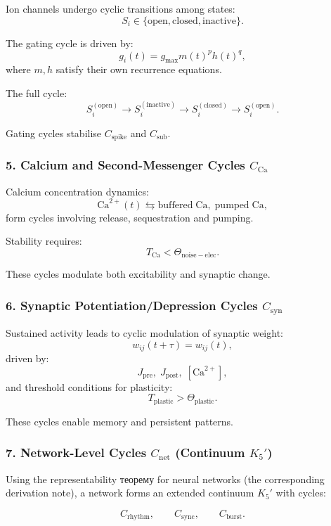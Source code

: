Ion channels undergo cyclic transitions among states:
\[
  S_i \in \{\mathrm{open}, \mathrm{closed}, \mathrm{inactive}\}.
\]

The gating cycle is driven by:
\[
  g_i(t) = g_{\mathrm{max}} m(t)^p h(t)^q,
\]
where $m,h$ satisfy their own recurrence equations.

The full cycle:
\[
  S_i^{(\mathrm{open})}
  \to 
  S_i^{(\mathrm{inactive})}
  \to
  S_i^{(\mathrm{closed})}
  \to
  S_i^{(\mathrm{open})}.
\]

Gating cycles stabilise $C_{\mathrm{spike}}$ and $C_{\mathrm{sub}}$.

\subsubsection{5. Calcium and Second-Messenger Cycles $C_{\mathrm{Ca}}$}

Calcium concentration dynamics:
\[
  \mathrm{Ca}^{2+}(t)
  \leftrightarrows
  \mathrm{buffered\; Ca},\;
  \mathrm{pumped\; Ca},
\]
form cycles involving release, sequestration and pumping.

Stability requires:
\[
  T_{\mathrm{Ca}} < \Theta_{\mathrm{noise-elec}}.
\]

These cycles modulate both excitability and synaptic change.

\subsubsection{6. Synaptic Potentiation/Depression Cycles $C_{\mathrm{syn}}$}

Sustained activity leads to cyclic modulation of synaptic weight:
\[
  w_{ij}(t+\tau) = w_{ij}(t),
\]
driven by:
\[
  J_{\mathrm{pre}},\; J_{\mathrm{post}},\; [\mathrm{Ca}^{2+}],
\]
and threshold conditions for plasticity:
\[
  T_{\mathrm{plastic}} > \Theta_{\mathrm{plastic}}.
\]

These cycles enable memory and persistent patterns.

\subsubsection{7. Network-Level Cycles $C_{\mathrm{net}}$ (Continuum $K_5'$)}

Using the representability теорему for neural networks (the corresponding derivation note),
a network forms an extended continuum $K_5'$ with cycles:

\[
  C_{\mathrm{rhythm}},
  \qquad
  C_{\mathrm{sync}},
  \qquad
  C_{\mathrm{burst}}.
\]

